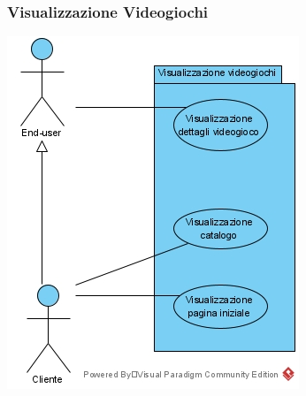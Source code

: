 \subsubsection{Visualizzazione Videogiochi}
\begin{center}
\includegraphics[width=\textwidth,height=\textheight,keepaspectratio]{Figure/UseCases/VisualizzazioneVideogioco.jpg}
\end{center}

